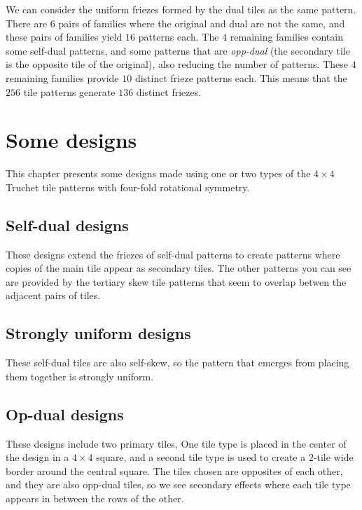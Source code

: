 \documentclass{tufte-book}
\begin{document}
\vspace{0.5cm}
\noindent
We can consider the uniform friezes formed by the dual tiles as the same pattern. There are $6$ pairs of families where the original and dual are not the same, and these pairs of families yield $16$ patterns each. The $4$ remaining families contain some self-dual patterns, and some patterns that are \textit{opp-dual} (the secondary tile is the opposite tile of the original), also reducing the number of patterns. These $4$ remaining families provide $10$ distinct frieze patterns each. This means that the $256$ tile patterns generate $136$ distinct friezes. 

\vspace{0.5cm}
\noindent

\noindent
\newpage



\chapter{Some designs}
This chapter presents some designs made using one or two types of the $4\times 4$ Truchet tile patterns with four-fold rotational symmetry.

\section{Self-dual designs}
These designs extend the friezes of self-dual patterns to create patterns where copies of the main tile appear as secondary tiles. The other patterns you can see are provided by the tertiary skew tile patterns that seem to overlap betwen the adjacent pairs of tiles.

{
\setlength{\tabcolsep}{0pt}
\renewcommand{\arraystretch}{0}

}

\section{Strongly uniform designs}

These self-dual tiles are also self-skew, so the pattern that emerges from placing them together is strongly uniform.
{
\setlength{\tabcolsep}{0pt}
\renewcommand{\arraystretch}{0}

}

\section{Op-dual designs}
These designs include two primary tiles, One tile type is placed in the center of the design in a $4\times 4$ square, and a second tile type is used to create a $2$-tile wide border around the central square. The tiles chosen are opposites of each other, and they are also opp-dual tiles, so we see secondary effects where each tile type appears in between the rows of the other.
{
\setlength{\tabcolsep}{0pt}
\renewcommand{\arraystretch}{0}

}
\end{document}
